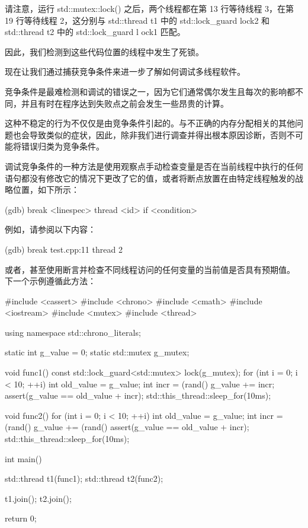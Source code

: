 请注意，运行 std::mutex::lock() 之后，两个线程都在第 13 行等待线程 3，在第 19 行等待线程 2，这分别与 std::thread t1 中的 std::lock\_guard lock2 和 std::thread t2 中的 std::lock\_guard l ock1 匹配。

因此，我们检测到这些代码位置的线程中发生了死锁。

现在让我们通过捕获竞争条件来进一步了解如何调试多线程软件。


竞争条件是最难检测和调试的错误之一，因为它们通常偶尔发生且每次的影响都不同，并且有时在程序达到失败点之前会发生一些昂贵的计算。

这种不稳定的行为不仅仅是由竞争条件引起的。与不正确的内存分配相关的其他问题也会导致类似的症状，因此，除非我们进行调查并得出根本原因诊断，否则不可能将错误归类为竞争条件。

调试竞争条件的一种方法是使用观察点手动检查变量是否在当前线程中执行的任何语句都没有修改它的情况下更改了它的值，或者将断点放置在由特定线程触发的战略位置，如下所示：

\begin{shell}
(gdb) break <linespec> thread <id> if <condition>
\end{shell}

例如，请参阅以下内容：

\begin{shell}
(gdb) break test.cpp:11 thread 2
\end{shell}

或者，甚至使用断言并检查不同线程访问的任何变量的当前值是否具有预期值。 下一个示例遵循此方法：

\begin{cpp}
#include <cassert>
#include <chrono>
#include <cmath>
#include <iostream>
#include <mutex>
#include <thread>

using namespace std::chrono_literals;

static int g_value = 0;
static std::mutex g_mutex;

void func1() {
    const std::lock_guard<std::mutex> lock(g_mutex);
    for (int i = 0; i < 10; ++i) {
        int old_value = g_value;
        int incr = (rand() %
        g_value += incr;
        assert(g_value == old_value + incr);
        std::this_thread::sleep_for(10ms);
    }
}

void func2() {
    for (int i = 0; i < 10; ++i) {
        int old_value = g_value;
        int incr = (rand() %
        g_value += (rand() %
        assert(g_value == old_value + incr);
        std::this_thread::sleep_for(10ms);
    }
}

int main() {
    std::thread t1(func1);
    std::thread t2(func2);

    t1.join();
    t2.join();

    return 0;
}
\end{cpp}

